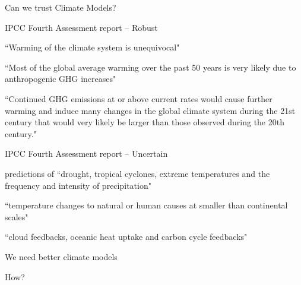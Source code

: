 \begin{slide}{Can we trust Climate Models?}

\begin{list0}

\item {\color{purple} IPCC Fourth Assessment report -- Robust}

    \begin{list1}
    \item ``Warming of the climate system is unequivocal"
    \item ``Most of the global average warming over the past 50 years is very likely due to anthropogenic GHG increases"
    \item ``Continued GHG emissions at or above current rates would cause further warming and induce many changes in the global climate system during the 21st century that would very likely be larger than those observed during the 20th century."
    \end{list1}

\item {\color{purple} IPCC Fourth Assessment report -- Uncertain}

    \begin{list1}
    \item predictions of ``drought, tropical cyclones, extreme temperatures and the frequency and intensity of precipitation"

    \item ``temperature changes to natural or human causes at smaller
than continental scales"
    \item ``cloud feedbacks, oceanic heat uptake and carbon cycle feedbacks"


    \end{list1}

\item {\color{purple} We need better climate models}

\item {\color{purple} How?}
\end{list0}
\end{slide}

